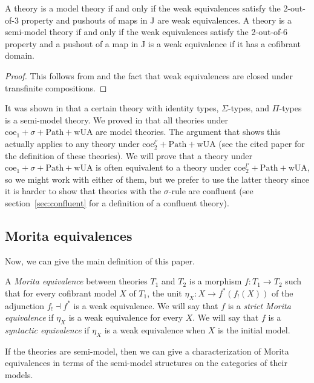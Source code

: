 \documentclass[reqno]{amsart}
\theoremstyle{definition}
\theoremstyle{remark}
\newcommand{\wUA}{\mathrm{wUA}}
\newcommand{\coeT}{\mathrm{coe}}
\newcommand{\PathT}{\mathrm{Path}}
\newcommand{\J}{\mathrm{J}}
\numberwithin{figure}{section}
\begin{document}
\begin{prop}
A theory is a model theory if and only if the weak equivalences satisfy the 2-out-of-3 property and pushouts of maps in $\J$ are weak equivalences.
A theory is a semi-model theory if and only if the weak equivalences satisfy the 2-out-of-6 property and a pushout of a map in $\J$ is a weak equivalence if it has a cofibrant domain.
\end{prop}
\begin{proof}
This follows from \cite[Proposition~3.1]{f-model-structures} and the fact that weak equivalences are closed under transfinite compositions.
\end{proof}

It was shown in \cite{kap-lum-model} that a certain theory with identity types, $\Sigma$-types, and $\Pi$-types is a semi-model theory.
We proved in \cite{alg-models} that all theories under $\coeT_1 + \sigma + \PathT + \wUA$ are model theories.
The argument that shows this actually applies to any theory under $\coeT^{l'}_2 + \PathT + \wUA$ (see the cited paper for the definition of these theories).
We will prove that a theory under $\coeT_1 + \sigma + \PathT + \wUA$ is often equivalent to a theory under $\coeT^{l'}_2 + \PathT + \wUA$, so we might work with either of them,
but we prefer to use the latter theory since it is harder to show that theories with the $\sigma$-rule are confluent (see section~\ref{sec:confluent} for a definition of a confluent theory).

\subsection{Morita equivalences}

Now, we can give the main definition of this paper.

\begin{defn}
A \emph{Morita equivalence} between theories $T_1$ and $T_2$ is a morphism $f : T_1 \to T_2$ such that for every cofibrant model $X$ of $T_1$,
the unit $\eta_X : X \to f^*(f_!(X))$ of the adjunction $f_! \dashv f^*$ is a weak equivalence.
We will say that $f$ is a \emph{strict Morita equivalence} if $\eta_X$ is a weak equivalence for every $X$.
We will say that $f$ is a \emph{syntactic equivalence} if $\eta_X$ is a weak equivalence when $X$ is the initial model.
\end{defn}

If the theories are semi-model, then we can give a characterization of Morita equivalences in terms of the semi-model structures on the categories of their models.
\end{document}
